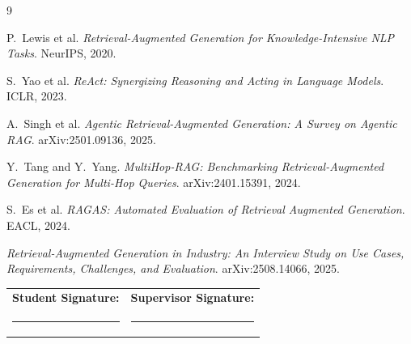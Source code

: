 \documentclass[10pt,a4paper]{article}
\begin{document}
\begingroup
\renewcommand{\refname}{\texorpdfstring{\color{mainblue}}{}Preliminary References}
\scriptsize
\begin{thebibliography}{9}
\setlength{\itemsep}{0pt}

P.\ Lewis et al.
\textit{Retrieval-Augmented Generation for Knowledge-Intensive NLP Tasks}.
NeurIPS, 2020.

S.\ Yao et al.
\textit{ReAct: Synergizing Reasoning and Acting in Language Models}.
ICLR, 2023.

A.\ Singh et al.
\textit{Agentic Retrieval-Augmented Generation: A Survey on Agentic RAG}.
arXiv:2501.09136, 2025.

Y.\ Tang and Y.\ Yang.
\textit{MultiHop-RAG: Benchmarking Retrieval-Augmented Generation for Multi-Hop Queries}.
arXiv:2401.15391, 2024.

S.\ Es et al.
\textit{RAGAS: Automated Evaluation of Retrieval Augmented Generation}.
EACL, 2024.

\textit{Retrieval-Augmented Generation in Industry: An Interview Study on Use Cases, Requirements, Challenges, and Evaluation}.
arXiv:2508.14066, 2025.

\end{thebibliography}
\endgroup

\vspace{0.1em}

\noindent
\begin{tabularx}{\textwidth}{X X}
\textbf{Student Signature:} & \textbf{Supervisor Signature:} \\[0.9em]
\rule{0.42\textwidth}{0.4pt} & \rule{0.42\textwidth}{0.4pt} \\
\end{tabularx}
\end{document}
